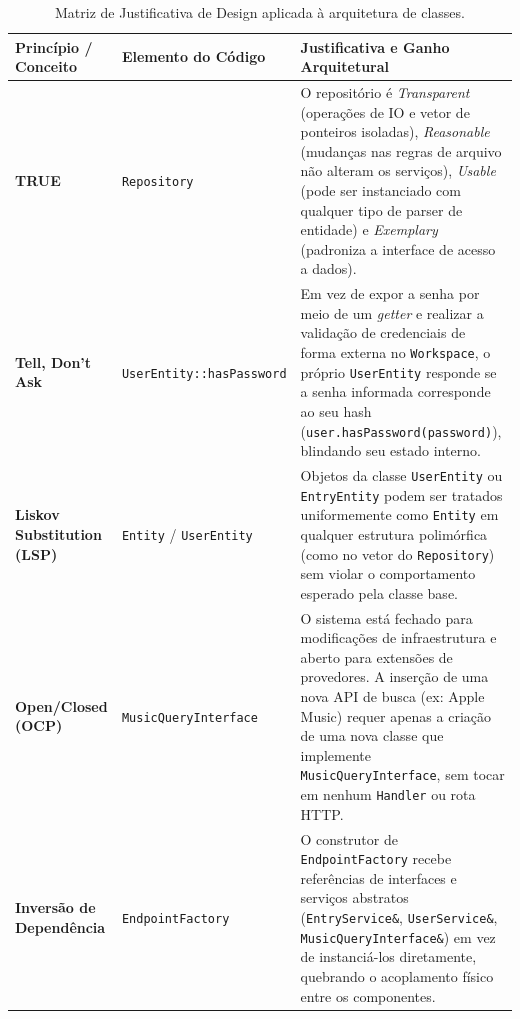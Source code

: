 \documentclass[12pt,a4paper]{article}
\begin{document}
\begin{table}[htbp]
    \centering
    \scriptsize
    \begin{tabular}{@{}llp{8.5cm}@{}}
        \toprule
        \textbf{Princípio / Conceito} & \textbf{Elemento do Código} & \textbf{Justificativa e Ganho Arquitetural} \\ \midrule
        \textbf{TRUE} & \texttt{Repository} & O repositório é \textit{Transparent} (operações de IO e vetor de ponteiros isoladas), \textit{Reasonable} (mudanças nas regras de arquivo não alteram os serviços), \textit{Usable} (pode ser instanciado com qualquer tipo de parser de entidade) e \textit{Exemplary} (padroniza a interface de acesso a dados). \\ \addlinespace
        \textbf{Tell, Don't Ask} & \texttt{UserEntity::hasPassword} & Em vez de expor a senha por meio de um \textit{getter} e realizar a validação de credenciais de forma externa no \texttt{Workspace}, o próprio \texttt{UserEntity} responde se a senha informada corresponde ao seu hash (\texttt{user.hasPassword(password)}), blindando seu estado interno. \\ \addlinespace
        \textbf{Liskov Substitution (LSP)} & \texttt{Entity} / \texttt{UserEntity} & Objetos da classe \texttt{UserEntity} ou \texttt{EntryEntity} podem ser tratados uniformemente como \texttt{Entity} em qualquer estrutura polimórfica (como no vetor do \texttt{Repository}) sem violar o comportamento esperado pela classe base. \\ \addlinespace
        \textbf{Open/Closed (OCP)} & \texttt{MusicQueryInterface} & O sistema está fechado para modificações de infraestrutura e aberto para extensões de provedores. A inserção de uma nova API de busca (ex: Apple Music) requer apenas a criação de uma nova classe que implemente \texttt{MusicQueryInterface}, sem tocar em nenhum \texttt{Handler} ou rota HTTP. \\ \addlinespace
        \textbf{Inversão de Dependência} & \texttt{EndpointFactory} & O construtor de \texttt{EndpointFactory} recebe referências de interfaces e serviços abstratos (\texttt{EntryService\&}, \texttt{UserService\&}, \texttt{MusicQueryInterface\&}) em vez de instanciá-los diretamente, quebrando o acoplamento físico entre os componentes. \\ \bottomrule
    \end{tabular}
    \caption{Matriz de Justificativa de Design aplicada à arquitetura de classes.}
    \label{tab:design_matrix}
\end{table}
\end{document}
